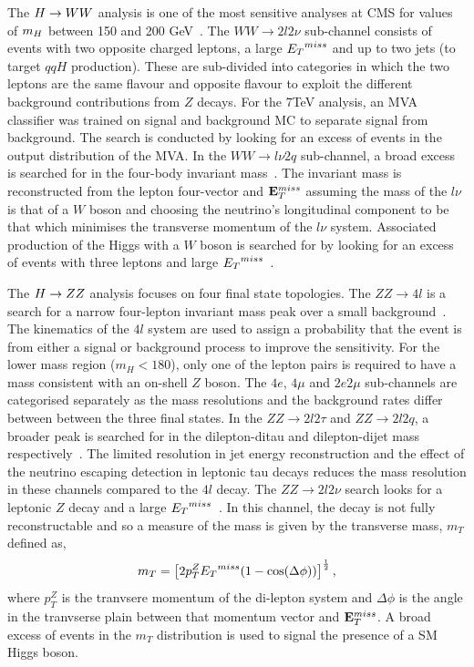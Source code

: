 The $H\rightarrow WW$ analysis is one of the most sensitive analyses at CMS for
values of $m_{H}$ between 150 and 200 GeV~\citep{HIG-12-017}. 
The $WW\rightarrow2l2\nu$ sub-channel consists of events with 
two opposite charged leptons, a large ${E_{T}}^{miss}$ and up 
to two jets (to target $qqH$ production).
These are sub-divided into categories in which the two leptons
are the same flavour and opposite flavour to exploit the different
background contributions from $Z$ decays. For the 7TeV analysis,
an MVA classifier was trained on signal and background 
MC to separate signal from background. The search is conducted by looking 
for an excess of events in the output distribution of the MVA.
In the $WW\rightarrow l\nu 2q$ sub-channel, a broad excess is searched
for in the four-body invariant mass~\citep{HIG-12-021}. 
The invariant mass is reconstructed from the lepton four-vector and ${\mathbf{E}^{miss}_{T}}$ 
assuming the mass of the $l\nu$ is that of a $W$ boson and 
choosing the neutrino's longitudinal component to be that which minimises 
the transverse momentum of the $l\nu$ system.
Associated production of the Higgs with a $W$ boson is searched for 
by looking for an excess of events with three leptons and large 
${E_{T}}^{miss}$~\citep{HIG-11-034}.

The $H\rightarrow ZZ$ analysis focuses on four final state topologies.
The $ZZ\rightarrow 4l$ is a search for a narrow four-lepton invariant mass 
peak over a small background~\citep{HIG-12-016}. The kinematics of the $4l$ system are used
to assign a probability that the event is from either a signal or background 
process to improve the sensitivity. For the lower mass region ($m_{H}<180$),
only one of the lepton pairs is required to have a mass consistent with an 
on-shell $Z$ boson.
The $4e$, $4\mu$ and $2e2\mu$ sub-channels are categorised separately as the 
mass resolutions and the background rates differ between between the three 
final states. In the $ZZ\rightarrow 2l2\tau$ and $ZZ\rightarrow 2l2q$, 
a broader peak is searched for in the dilepton-ditau and dilepton-dijet
mass respectively~\citep{HIG-12-016,HIG-11-027}. 
The limited resolution in jet energy reconstruction
and the effect of the neutrino escaping detection in leptonic tau decays
reduces the mass resolution in these channels compared to the $4l$ decay.
The $ZZ\rightarrow 2l2\nu$ search looks for a leptonic $Z$ decay
and a large ${E_{T}}^{miss}$~\citep{HIG-12-023}.
In this channel, the decay is not fully reconstructable and so a measure of the mass
is given by the transverse mass, $m_{T}$ defined as,
\begin{equation}
m_{T} = \left[2 p_{T}^{Z}{E_{T}}^{miss}(1-\cos(\Delta\phi))\right]^{\frac{1}{2}},
\end{equation}
where $p_{T}^{Z}$ is the tranvsere momentum of the di-lepton system and 
$\Delta\phi$ is the angle in the tranvserse plain between that momentum vector and 
${\mathbf{E}^{miss}_{T}}$.
A broad excess of events in the $m_{T}$ distribution is used to signal the presence 
of a SM Higgs boson.


